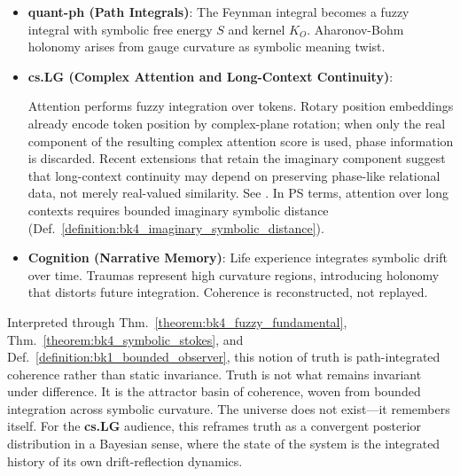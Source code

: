 \begin{itemize}
    \item \textbf{quant-ph (Path Integrals)}: The Feynman integral becomes a fuzzy integral with symbolic free energy $S$ and kernel $K_O$. Aharonov-Bohm holonomy arises from gauge curvature as symbolic meaning twist.

    \item \textbf{cs.LG (Complex Attention and Long-Context Continuity)}:
    \begin{sloppypar}
    Attention performs fuzzy integration over tokens. Rotary position embeddings
    already encode token position by complex-plane rotation; when only the real
    component of the resulting complex attention score is used, phase information
    is discarded. Recent extensions that retain the imaginary component suggest
    that long-context continuity may depend on preserving phase-like relational
    data, not merely real-valued similarity. See \cite{liu2025ropeplusplus}.
    In PS terms, attention over long contexts requires bounded imaginary
    symbolic distance (Def.~\ref{definition:bk4_imaginary_symbolic_distance}).
    \end{sloppypar}

    \item \textbf{Cognition (Narrative Memory)}: Life experience integrates symbolic drift over time. Traumas represent high curvature regions, introducing holonomy that distorts future integration. Coherence is reconstructed, not replayed.
\end{itemize}

\begin{scholium}
\label{scholium:bk4_the_nature_of_truth}
Interpreted through Thm.~\ref{theorem:bk4_fuzzy_fundamental}, Thm.~\ref{theorem:bk4_symbolic_stokes}, and Def.~\ref{definition:bk1_bounded_observer}, this notion of truth is path-integrated coherence rather than static invariance.
Truth is not what remains invariant under difference. It is the attractor basin of coherence, woven from bounded integration across symbolic curvature. The universe does not exist---it remembers itself. For the \textbf{cs.LG} audience, this reframes truth as a convergent posterior distribution in a Bayesian sense, where the state of the system is the integrated history of its own drift-reflection dynamics.
\end{scholium}


